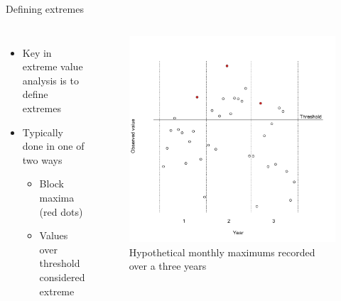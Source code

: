 \documentclass{beamer}
\begin{document}
\begin{frame}{Defining extremes}
\begin{columns}[c]
  \begin{itemize} \setlength{\itemsep}{1em}
    \item Key in extreme value analysis is to define extremes
    \item Typically done in one of two ways
    \begin{itemize}
      \item Block maxima (red dots)
      \item Values over threshold considered extreme
    \end{itemize}
  \end{itemize}

  \begin{figure}
    \includegraphics[width=1\linewidth, trim=0 0.5in 0 1in]{./plots/define_extreme.pdf}
    \caption{Hypothetical monthly maximums recorded over a three years}
    \end{figure}
\end{columns}
\end{frame}
\end{document}
